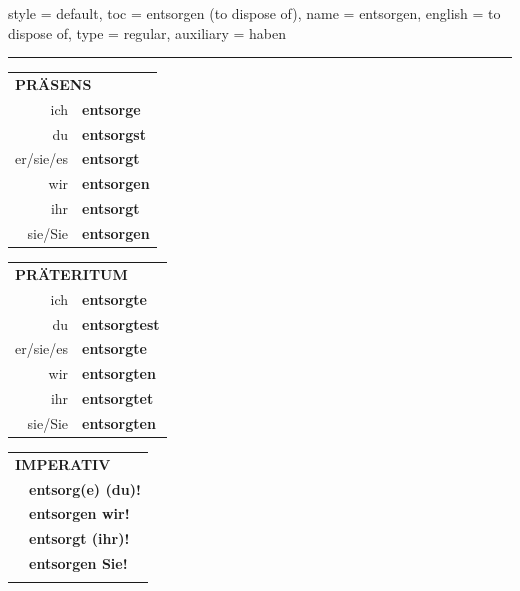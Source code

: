 \begin{verbentry}{
  style = {default},
  toc = {entsorgen (to dispose of)},
  name = {entsorgen},
  english = {to dispose of},
  type = {regular},
  auxiliary = {haben}
}
 
    
     \vspace{5pt}

    \hrule
    
    \vspace{5pt}

  \begin{tabular}{rl}
     \multicolumn{2}{l}{\textbf{PRÄSENS} }\\
    ich & \textbf{entsorge}\\
    du & \textbf{entsorgst}\\
    er/sie/es & \textbf{entsorgt}\\
    wir & \textbf{entsorgen}\\
    ihr & \textbf{entsorgt}\\
    sie/Sie & \textbf{entsorgen}\\
  \end{tabular}
  \hfill
     \begin{tabular}{rl}
    \multicolumn{2}{l}{\textbf{PRÄTERITUM} }\\
    ich & \textbf{entsorgte}\\
    du & \textbf{entsorgtest}\\
    er/sie/es & \textbf{entsorgte}\\
    wir & \textbf{entsorgten}\\
    ihr & \textbf{entsorgtet}\\
    sie/Sie & \textbf{entsorgten}\\
  \end{tabular}
  \hfill
  \begin{tabular}{rl}
     \multicolumn{2}{l}{\textbf{IMPERATIV} }\\
   & \textbf{entsorg(e) (du)!}\\
   & \textbf{entsorgen wir!}\\
   & \textbf{entsorgt (ihr)!}\\
   & \textbf{entsorgen Sie!}\\
   & \vspace{10pt}
  \end{tabular}

    \vspace{10pt}


\end{verbentry}
